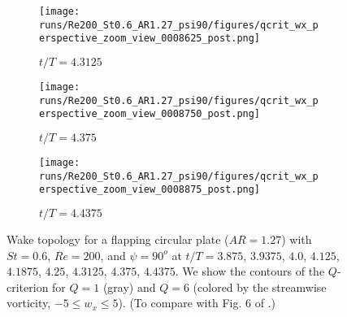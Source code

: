 \begin{figure}
\begin{subfigure}[b]{0.3\textwidth}
    \centering
    \texttt{[image: runs/Re200\_St0.6\_AR1.27\_psi90/figures/qcrit\_wx\_perspective\_zoom\_view\_0008625\_post.png]}
    \caption{$t / T = 4.3125$}
    \label{fig:baseline_qcrit_perspective:0008625}
  \end{subfigure}
  \hspace{0.5em}
  \begin{subfigure}[b]{0.3\textwidth}
    \centering
    \texttt{[image: runs/Re200\_St0.6\_AR1.27\_psi90/figures/qcrit\_wx\_perspective\_zoom\_view\_0008750\_post.png]}
    \caption{$t / T = 4.375$}
    \label{fig:baseline_qcrit_perspective:0008750}
  \end{subfigure}
  \hspace{0.5em}
  \begin{subfigure}[b]{0.3\textwidth}
    \centering
    \texttt{[image: runs/Re200\_St0.6\_AR1.27\_psi90/figures/qcrit\_wx\_perspective\_zoom\_view\_0008875\_post.png]}
    \caption{$t / T = 4.4375$}
    \label{fig:baseline_qcrit_perspective:0008875}
  \end{subfigure}
  \caption{Wake topology for a flapping circular plate ($AR = 1.27$) with $St = 0.6$, $Re = 200$, and $\psi = 90^o$ at $t / T = 3.875$, $3.9375$, $4.0$, $4.125$, $4.1875$, $4.25$, $4.3125$, $4.375$, $4.4375$. We show the contours of the $Q$-criterion for $Q = 1$ (gray) and $Q = 6$ (colored by the streamwise vorticity, $-5 \leq w_x \leq 5$). (To compare with Fig. 6 of \citet{li_dong_2016}.)}
  \label{fig:baseline_qcrit_perspective}
\end{figure}

